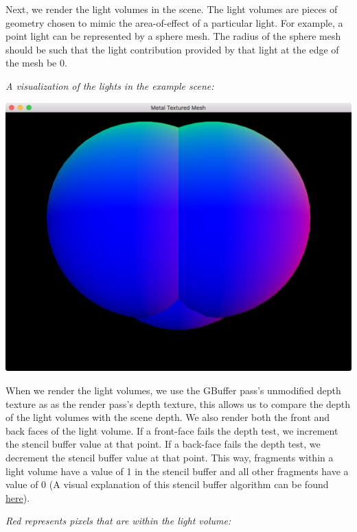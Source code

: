 \documentclass[11pt]{article}
\begin{document}
Next, we render the light volumes in the scene. The light volumes are pieces of
geometry chosen to mimic the area-of-effect of a particular light. For example,
a point light can be represented by a sphere mesh. The radius of the sphere mesh
should be such that the light contribution provided by that light at the edge of
the mesh be 0.

\emph{A visualization of the lights in the example scene:}


\begin{center}
\includegraphics[width=.9\linewidth]{../img/posts/implementing-deferred-shading-in-metal/lights-normal-fake.png}
\end{center}

When we render the light volumes, we use the GBuffer pass's unmodified depth
texture as as the render pass's depth texture, this allows us to compare the
depth of the light volumes with the scene depth. We also render both the front
and back faces of the light volume. If a front-face fails the depth test, we
increment the stencil buffer value at that point. If a back-face fails the depth
test, we decrement the stencil buffer value at that point. This way, fragments
within a light volume have a value of 1 in the stencil buffer and all other
fragments have a value of 0 (A visual explanation of this stencil buffer
algorithm can be found \href{http://ogldev.atspace.co.uk/www/tutorial37/tutorial37.html}{here}).

\emph{Red represents pixels that are within the light volume:}
\end{document}
